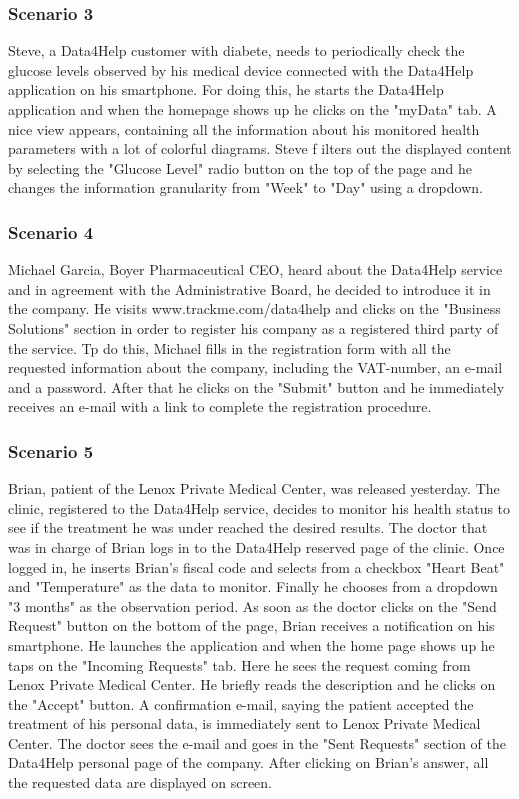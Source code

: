 \subsubsection{Scenario 3}
Steve, a Data4Help customer with diabete, needs to periodically check the glucose levels observed by his medical device connected with the Data4Help application on his smartphone. For doing this, he starts the Data4Help application and when the homepage shows up he  clicks on the "myData" tab. A nice view appears, containing all the information about his monitored health parameters with a lot of colorful diagrams. Steve f ilters out the displayed content by selecting the "Glucose Level" radio button on the top of the page and he changes the information granularity from "Week" to "Day" using a dropdown.  
\subsubsection{Scenario 4}
Michael Garcia, Boyer Pharmaceutical CEO, heard about the Data4Help service and in agreement with the Administrative Board, he decided to introduce it in the company. He visits  www.trackme.com/data4help and clicks on the "Business Solutions" section in order to register his company as a registered third party of the service. Tp do this, Michael fills in the registration form with all the requested information about the company, including the VAT-number, an e-mail and a password. After that he clicks on the "Submit" button and he immediately receives an e-mail with a link to complete the registration procedure.
\subsubsection{Scenario 5}
Brian, patient of the Lenox Private Medical Center, was released  yesterday. The clinic, registered to the Data4Help service, decides to monitor his health status to see if the treatment he was under reached the desired results.
The doctor that was in charge of Brian logs in to the Data4Help reserved page of the clinic. Once logged in, he inserts Brian's fiscal code and selects from a checkbox "Heart Beat" and "Temperature" as the data to monitor. Finally he chooses from a dropdown "3 months" as the observation period.
As soon as the doctor clicks on the "Send Request" button on the bottom of the page, Brian receives a notification on his smartphone. He launches the application and when the home page shows up he taps on the "Incoming Requests" tab. Here he sees the request coming from Lenox Private Medical Center. He briefly reads the description and he clicks on the "Accept" button. A confirmation e-mail, saying the patient accepted the treatment of his personal data, is immediately sent to Lenox Private Medical Center.
The doctor sees the e-mail and goes in the "Sent Requests" section of the Data4Help personal page of the company. After clicking on Brian's answer, all the requested data are displayed on screen.
